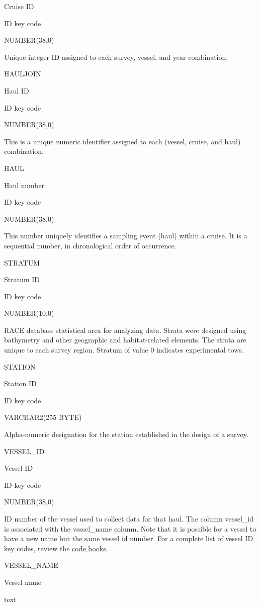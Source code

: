 \documentclass[
  letterpaper,
  oneside,
  open=any]{scrbook}
\begin{document}
Cruise ID

ID key code

NUMBER(38,0)

Unique integer ID assigned to each survey, vessel, and year combination.

HAULJOIN

Haul ID

ID key code

NUMBER(38,0)

This is a unique numeric identifier assigned to each (vessel, cruise,
and haul) combination.

HAUL

Haul number

ID key code

NUMBER(38,0)

This number uniquely identifies a sampling event (haul) within a cruise.
It is a sequential number, in chronological order of occurrence.

STRATUM

Stratum ID

ID key code

NUMBER(10,0)

RACE database statistical area for analyzing data. Strata were designed
using bathymetry and other geographic and habitat-related elements. The
strata are unique to each survey region. Stratum of value 0 indicates
experimental tows.

STATION

Station ID

ID key code

VARCHAR2(255 BYTE)

Alpha-numeric designation for the station established in the design of a
survey.

VESSEL\_ID

Vessel ID

ID key code

NUMBER(38,0)

ID number of the vessel used to collect data for that haul. The column
vessel\_id is associated with the vessel\_name column. Note that it is
possible for a vessel to have a new name but the same vessel id number.
For a complete list of vessel ID key codes, review the
\href{https://www.fisheries.noaa.gov/resource/document/groundfish-survey-species-code-manual-and-data-codes-manual}{code
books}.

VESSEL\_NAME

Vessel name

text
\end{document}
